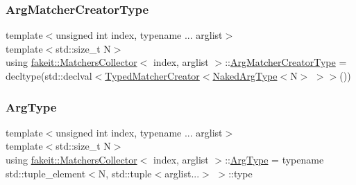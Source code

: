 \mbox{\label{classfakeit_1_1MatchersCollector_a1b9d32a66882e0559e7072f1db88eee3}} 
\subsubsection{\texorpdfstring{ArgMatcherCreatorType}{ArgMatcherCreatorType}\hspace{0.1cm}{\footnotesize\ttfamily [9/9]}}
{\footnotesize\ttfamily template$<$unsigned int index, typename ... arglist$>$ \\
template$<$std\+::size\+\_\+t N$>$ \\
using \mbox{\hyperlink{classfakeit_1_1MatchersCollector}{fakeit\+::\+Matchers\+Collector}}$<$ index, arglist $>$\+::\mbox{\hyperlink{classfakeit_1_1MatchersCollector_a1b9d32a66882e0559e7072f1db88eee3}{Arg\+Matcher\+Creator\+Type}} =  decltype(std\+::declval$<$\mbox{\hyperlink{structfakeit_1_1TypedMatcherCreator}{Typed\+Matcher\+Creator}}$<$\mbox{\hyperlink{classfakeit_1_1MatchersCollector_aeda8ced6a2f0cb7c6e4f916f18a91730}{Naked\+Arg\+Type}}$<$N$>$ $>$$>$())}

\mbox{\label{classfakeit_1_1MatchersCollector_aaba0fca8c182a698dda8ca056c29fe5f}} 
\subsubsection{\texorpdfstring{ArgType}{ArgType}\hspace{0.1cm}{\footnotesize\ttfamily [1/9]}}
{\footnotesize\ttfamily template$<$unsigned int index, typename ... arglist$>$ \\
template$<$std\+::size\+\_\+t N$>$ \\
using \mbox{\hyperlink{classfakeit_1_1MatchersCollector}{fakeit\+::\+Matchers\+Collector}}$<$ index, arglist $>$\+::\mbox{\hyperlink{classfakeit_1_1MatchersCollector_aaba0fca8c182a698dda8ca056c29fe5f}{Arg\+Type}} =  typename std\+::tuple\+\_\+element$<$N, std\+::tuple$<$arglist...$>$ $>$\+::type}

